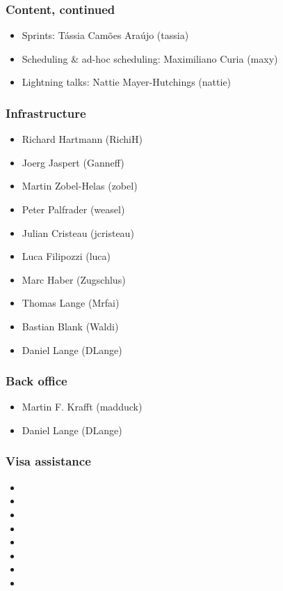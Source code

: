 \documentclass[t]{beamer}
\begin{document}
\begin{frame}
	\frametitle{Content, continued}
	\begin{itemize}
		\item Sprints: Tássia Camões Araújo (tassia)
		\item Scheduling \& ad-hoc scheduling: Maximiliano Curia (maxy)
		\item Lightning talks: Nattie Mayer-Hutchings (nattie)
	\end{itemize}
\end{frame}

\begin{frame}
	\frametitle{Infrastructure}
	\begin{itemize}
		\item Richard Hartmann (RichiH)
		\item Joerg Jaspert (Ganneff)
		\item Martin Zobel-Helas (zobel)
		\item Peter Palfrader (weasel)
		\item Julian Cristeau (jcristeau)
		\item Luca Filipozzi (luca)
		\item Marc Haber (Zugschlus)
		\item Thomas Lange (Mrfai)
		\item Bastian Blank (Waldi)
		\item Daniel Lange (DLange)
	\end{itemize}
\end{frame}

\begin{frame}
	\frametitle{Back office}
	\begin{itemize}
		\item Martin F. Krafft (madduck)
		\item Daniel Lange (DLange)
	\end{itemize}
\end{frame}

\begin{frame}
	\frametitle{Visa assistance}
	\begin{itemize}
		\item 
		\item 
		\item 
		\item 
		\item 
		\item 
		\item 
		\item 
	\end{itemize}
\end{frame}
\end{document}
